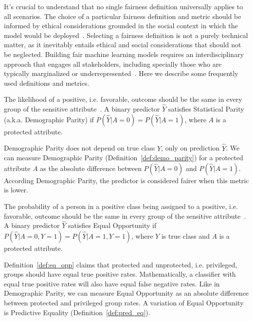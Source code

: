 It's crucial to understand that no single fairness definition universally applies to all scenarios. The choice of a particular fairness definition and metric should be informed by ethical considerations grounded in the social context in which the model would be deployed~\citep{AlerTubella2022}. Selecting a fairness definition is not a purely technical matter, as it inevitably entails ethical and social considerations that should not be neglected. Building fair machine learning models requires an interdisciplinary approach that engages all stakeholders, including specially those who are typically marginalized or underrepresented~\citep{Weinberg2022}.  Here we describe some frequently used definitions and metrics.

\begin{definition}\label{def:demo_parity}
The likelihood of a positive, i.e. favorable, outcome should be the same in every group of the sensitive attribute~\citep{Dwork2011,Kusner2018}. A binary predictor $\hat{Y}$ satisfies Statistical Parity (a.k.a. Demographic Parity) if $P(\hat{Y}|A=0) = P(\hat{Y}|A=1)$, where $A$ is a protected attribute.
\end{definition}

Demographic Parity does not depend on true class $Y$, only on prediction $\hat{Y}$. We can measure Demographic Parity (Definition~\ref{def:demo_parity}) for a protected attribute $A$ as the absolute difference between $P(\hat{Y}|A=0)$ and $P(\hat{Y}|A=1)$. According Demographic Parity, the predictor is considered fairer when this metric is lower. 

\begin{definition}\label{def:eq_opp}
The probability of a person in a positive class being assigned to a positive, i.e. favorable, outcome should be the same in every group of the sensitive attribute~\citep{Hardt2016}. A binary predictor $\hat{Y}$ satisfies Equal Opportunity if $P(\hat{Y}|A=0,Y=1) = P(\hat{Y}|A=1,Y=1)$, where $Y$ is true class and $A$ is a protected attribute.
\end{definition}

Definition~\ref{def:eq_opp} claims that protected and unprotected, i.e. privileged, groups should have equal true positive rates. Mathematically, a classifier with equal true positive rates will also have equal false negative rates. Like in Demographic Parity, we can measure Equal Opportunity as an absolute difference between protected and privileged group rates. A variation of Equal Opportunity is Predictive Equality (Definition~\ref{def:pred_eq}).

